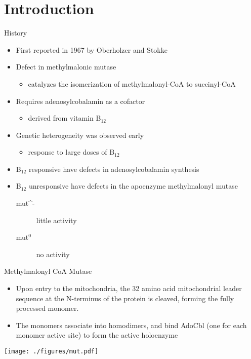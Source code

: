 \documentclass[presentation, smaller]{beamer}
\begin{document}
\section{Introduction}
\label{sec:orgheadline12}
\begin{frame}[label={sec:orgheadline1}]{History}
\begin{itemize}
\item First reported in 1967 by Oberholzer and Stokke
\item Defect in methylmalonic mutase
\begin{itemize}
\item catalyzes the isomerization of methylmalonyl-CoA to succinyl-CoA
\end{itemize}
\item Requires adenosylcobalamin as a cofactor
\begin{itemize}
\item derived from vitamin B\(_{\text{12}}\)
\end{itemize}
\item Genetic heterogeneity was observed early
\begin{itemize}
\item response to large doses of B\(_{\text{12}}\)
\end{itemize}
\item B\(_{\text{12}}\) responsive have defects in adenosylcobalamin synthesis
\item B\(_{\text{12}}\) unresponsive have defects in the apoenzyme methylmalonyl mutase
\begin{description}
\item[{mut\^{}-}] little activity
\item[{mut\(^{\text{0}}\)}] no activity
\end{description}
\end{itemize}
\end{frame}

\begin{frame}[label={sec:orgheadline2}]{Methylmalonyl CoA Mutase}
\begin{itemize}
\item Upon entry to the mitochondria, the 32 amino acid mitochondrial
leader sequence at the N-terminus of the protein is cleaved, forming
the fully processed monomer.
\item The monomers associate into homodimers, and bind AdoCbl (one
for each monomer active site) to form the active holoenzyme
\end{itemize}

\texttt{[image: ./figures/mut.pdf]}
\end{frame}
\end{document}
